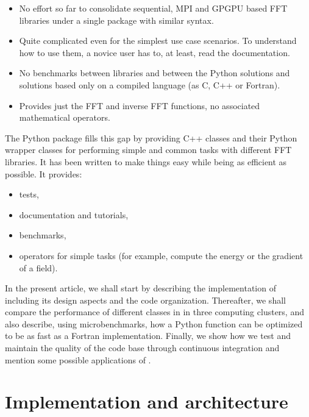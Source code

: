 \begin{itemize}
  \item No effort so far to consolidate sequential, MPI and GPGPU based FFT
  libraries under a single package with similar syntax.

  \item Quite complicated even for the simplest use case scenarios. To
  understand how to use them, a novice user has to, at least, read the
   documentation.

  \item No benchmarks between libraries and between the Python
  solutions and solutions based only on a compiled language (as C, C++ or
  Fortran).

  \item Provides just the FFT and inverse FFT functions, no associated
  mathematical operators.

\end{itemize}

The Python package  fills this gap by providing C++ classes and
their Python wrapper classes for performing simple and common tasks with different
FFT libraries. It has been written to make things easy while being as efficient as
possible. It provides:

\begin{itemize}
\item tests,

\item documentation and tutorials,

\item benchmarks,

\item operators for simple tasks (for example, compute the energy or the
gradient of a field).

\end{itemize}

In the present article, we shall start by describing the implementation of
 including its design aspects and the code organization. Thereafter,
we shall compare the performance of different classes in  in
three computing clusters, and also describe, using microbenchmarks, how a Python
function can be optimized to be as fast as a Fortran implementation. Finally,
we show how we test and maintain the quality of the code base through
continuous integration and mention some possible applications of
.

\section{Implementation and architecture}

